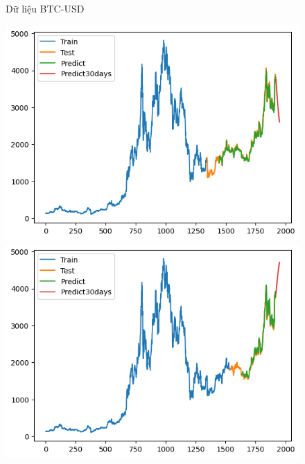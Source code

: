 \documentclass[conference]{IEEEtran}
\begin{document}
\begin{figure}[H]
\begin{minipage}{0.15\textwidth}
		\end{minipage}
		\caption{Dữ liệu BTC-USD}
		\label{fig:1}
	\end{figure}
	
\begin{figure}[H]
	\centering
	\begin{minipage}{0.15\textwidth}
		\centering
		\includegraphics[width=1\textwidth]{Figure/GRU_ETH_73.png}
	\end{minipage}
	\hfill
	\begin{minipage}{0.15\textwidth}
		\centering
		\includegraphics[width=1\textwidth]{Figure/GRU_ETH_82.png}
	\end{minipage}
	\hfill
	\begin{minipage}{0.15\textwidth}
		\centering

\end{minipage}
\end{figure}
\end{document}
